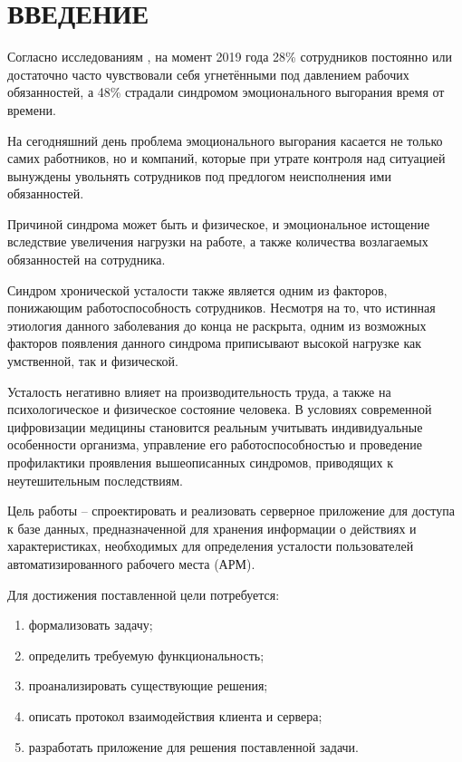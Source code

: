 \section*{ВВЕДЕНИЕ}

Согласно исследованиям \cite{burnout}, на момент 2019 года 28\% сотрудников постоянно или достаточно часто чувствовали себя угнетёнными под давлением рабочих обязанностей, а 48\% страдали синдромом эмоционального выгорания время от времени.

На сегодняшний день проблема эмоционального выгорания касается не только самих работников, но и компаний, которые при утрате контроля над ситуацией вынуждены увольнять сотрудников под предлогом неисполнения ими обязанностей. \cite{CompanyProblem}

Причиной синдрома может быть и физическое, и эмоциональное истощение вследствие увеличения нагрузки на работе, а также количества возлагаемых обязанностей на сотрудника. \cite{Prichini}

Синдром хронической усталости также является одним из факторов, понижающим работоспособность сотрудников. Несмотря на то, что истинная этиология данного заболевания до конца не раскрыта, одним из возможных факторов появления данного синдрома приписывают высокой нагрузке как умственной, так и физической. \cite{SHU}

Усталость негативно влияет на производительность труда, а также на психологическое и физическое состояние человека. В условиях современной цифровизации медицины становится реальным учитывать индивидуальные особенности организма, управление его работоспособностью и проведение профилактики проявления вышеописанных синдромов, приводящих к неутешительным последствиям.

Цель работы -- спроектировать и реализовать серверное приложение для доступа к базе данных, предназначенной для хранения информации о действиях и характеристиках, необходимых для определения усталости пользователей автоматизированного рабочего места (АРМ).

Для достижения поставленной цели потребуется:
\begin{enumerate}[leftmargin=1.6\parindent]
\item формализовать задачу;
\item определить требуемую функциональность;
\item проанализировать существующие решения;
\item описать протокол взаимодействия клиента и сервера;
\item разработать приложение для решения поставленной задачи.
\end{enumerate}

\pagebreak